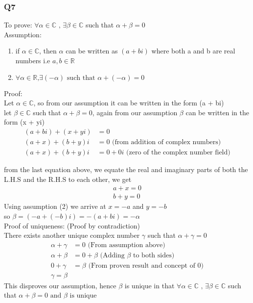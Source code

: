 \documentclass{article}
\begin{document}
\subsubsection*{Q7}
To prove: $\forall \alpha \in \mathbb{C} \textrm{ , } \exists \beta \in \mathbb{C}$ such that $\alpha + \beta = 0$ \\
Assumption:
\begin{enumerate}
    \item if $\alpha \in \mathbb{C}$, then $\alpha$ can be written as $(a + bi)$ where both a and b are real numbers i.e $a,b\in \mathbb{R}$
    \item $\forall \alpha \in \mathbb{R} \textrm{,} \exists (-\alpha) \textrm{ such that } \alpha + (-\alpha) = 0$ 
\end{enumerate}
Proof:\\
Let $\alpha \in \mathbb{C}$, so from our assumption it can be written in the form (a + bi) \\
let $\beta \in \mathbb{C}$ such that $\alpha + \beta = 0$, again from our assumption $\beta$ can be written in the form (x + yi) \\
\begin{equation*}
\begin{split}
    (a + bi) + (x + yi) &= 0 \\
    (a+x) + (b + y)i &= 0 \textrm{ (from addition of complex numbers)} \\
    (a + x) + (b + y)i &= 0 + 0i \textrm{ (zero of the complex number field)}
\end{split}
\end{equation*}

from the last equation above, we equate the real and imaginary parts of both the L.H.S and the R.H.S to each other, we get \\
\begin{gather*}
    a + x = 0 \\
    b + y = 0
\end{gather*}
Using assumption (2) we arrive at $x = -a$ and $y = -b$ \\
so $\beta = (-a + (-b)i) = -(a+bi) = -\alpha$ \\

Proof of uniqueness: (Proof by contradiction) \\
There exists another unique complex number $\gamma $ such that $\alpha + \gamma = 0$
\begin{align*}
    \alpha + \gamma &= 0 \textrm{ (From assumption above)} \\
    \alpha + \beta &= 0 + \beta \textrm{ (Adding $\beta$ to both sides)} \\
    0 + \gamma &= \beta \textrm{ (From proven result and concept of 0)} \\
    \gamma = \beta
\end{align*}
This disproves our assumption, hence $\beta$ is unique in that $\forall \alpha \in \mathbb{C} \textrm{ , } \exists \beta \in \mathbb{C}$ such that $\alpha + \beta = 0 \textrm{ and $\beta$ is unique}$ 
\end{document}
